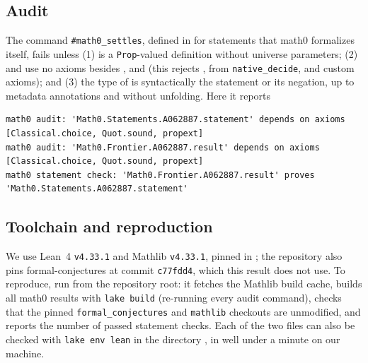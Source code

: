 \documentclass[11pt]{amsart}
\theoremstyle{plain}
\theoremstyle{definition}
\begin{document}
\subsection*{Audit}
The command \texttt{\#math0\_settles}, defined in  for statements that math0 formalizes itself, fails unless (1)  is a \texttt{Prop}-valued definition without universe parameters; (2)  and  use no axioms besides ,  and  (this rejects ,  from \texttt{native\_decide}, and custom axioms); and (3) the type of  is syntactically the statement or its negation, up to metadata annotations and without unfolding. Here it reports
\begin{lstlisting}[basicstyle=\ttfamily\tiny]
math0 audit: 'Math0.Statements.A062887.statement' depends on axioms [Classical.choice, Quot.sound, propext]
math0 audit: 'Math0.Frontier.A062887.result' depends on axioms [Classical.choice, Quot.sound, propext]
math0 statement check: 'Math0.Frontier.A062887.result' proves 'Math0.Statements.A062887.statement'
\end{lstlisting}

\subsection*{Toolchain and reproduction}
We use Lean~4 \cite{Lean4} \texttt{v4.33.1} and Mathlib \cite{Mathlib} \texttt{v4.33.1}, pinned in ; the repository also pins formal-conjectures \cite{FC} at commit \texttt{c77fdd4}, which this result does not use.
To reproduce, run  from the repository root: it fetches the Mathlib build cache, builds all math0 results with \texttt{lake build} (re-running every audit command), checks that the pinned \texttt{formal\_conjectures} and \texttt{mathlib} checkouts are unmodified, and reports the number of passed statement checks. Each of the two files can also be checked with \texttt{lake env lean} in the directory , in well under a minute on our machine.
\end{document}
